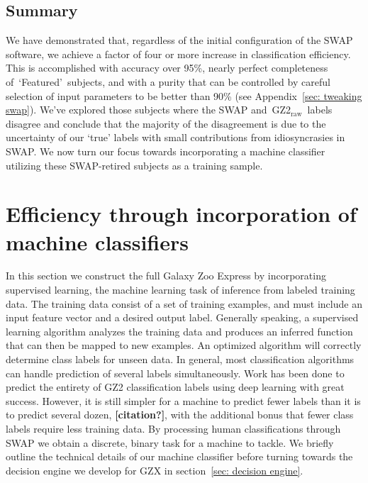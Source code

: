 \documentclass[twocolumn]{aastex6}
\newcommand{\feat}{`Featured'}
\newcommand{\raw}{GZ2$_{\text{raw}}$}
\begin{document}
\subsection{Summary}

We have demonstrated that, regardless of the initial configuration of the SWAP 
software, we achieve a factor of four or more increase in classification efficiency. 
This is accomplished with accuracy over 95\%, nearly perfect completeness 
of~\feat~subjects, and with a purity that can be controlled by careful selection of 
input parameters to be better than 90\% (see Appendix~\ref{sec: tweaking swap}).
We've explored those subjects where the SWAP and~\raw~labels disagree
and conclude that the majority of the disagreement is due to the uncertainty of 
our `true' labels with small contributions from idiosyncrasies in SWAP. 
We now turn our focus towards incorporating a machine
classifier utilizing these SWAP-retired subjects as a training sample. 


\section{Efficiency through incorporation of machine classifiers} \label{sec: machine}

In this section we construct the full Galaxy Zoo Express by incorporating supervised 
learning, the machine learning task of inference from labeled training data. 
The training data consist of a set of training examples, and must include
an input feature vector and a desired output label.  Generally speaking,
a supervised learning algorithm analyzes the training data and produces an inferred 
function that can then be mapped to new examples. An optimized algorithm will 
correctly determine class labels for unseen data. In general, most classification 
algorithms can handle prediction of several labels simultaneously. Work has been
done to predict the entirety of GZ2 classification labels using deep learning 
\citep{Dieleman2015} with great success. 
However, it is still simpler for a machine to predict fewer labels than it is to predict several dozen, \textbf{[citation?]}, 
with the additional bonus that fewer class labels require less training data. 
By processing human classifications through SWAP we obtain a discrete, binary task
for a machine to tackle. We briefly outline the technical details of our machine
classifier before turning towards the decision engine we develop for GZX in 
section~\ref{sec: decision engine}. 
\end{document}
